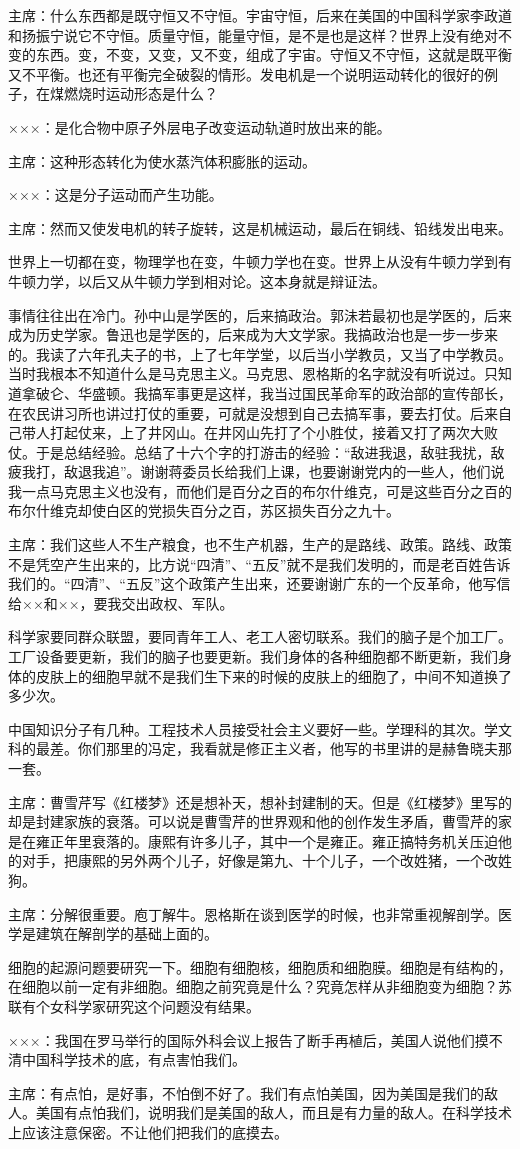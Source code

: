 主席：什么东西都是既守恒又不守恒。宇宙守恒，后来在美国的中国科学家李政道和扬振宁说它不守恒。质量守恒，能量守恒，是不是也是这样？世界上没有绝对不变的东西。变，不变，又变，又不变，组成了宇宙。守恒又不守恒，这就是既平衡又不平衡。也还有平衡完全破裂的情形。发电机是一个说明运动转化的很好的例子，在煤燃烧时运动形态是什么？

×××：是化合物中原子外层电子改变运动轨道时放出来的能。

主席：这种形态转化为使水蒸汽体积膨胀的运动。

×××：这是分子运动而产生功能。

主席：然而又使发电机的转子旋转，这是机械运动，最后在铜线、铅线发出电来。

世界上一切都在变，物理学也在变，牛顿力学也在变。世界上从没有牛顿力学到有牛顿力学，以后又从牛顿力学到相对论。这本身就是辩证法。

事情往往出在冷门。孙中山是学医的，后来搞政治。郭沬若最初也是学医的，后来成为历史学家。鲁迅也是学医的，后来成为大文学家。我搞政治也是一步一步来的。我读了六年孔夫子的书，上了七年学堂，以后当小学教员，又当了中学教员。当时我根本不知道什么是马克思主义。马克思、恩格斯的名字就没有听说过。只知道拿破仑、华盛顿。我搞军事更是这样，我当过国民革命军的政治部的宣传部长，在农民讲习所也讲过打仗的重要，可就是没想到自己去搞军事，要去打仗。后来自己带人打起仗来，上了井冈山。在井冈山先打了个小胜仗，接着又打了两次大败仗。于是总结经验。总结了十六个字的打游击的经验：“敌进我退，敌驻我扰，敌疲我打，敌退我追”。谢谢蒋委员长给我们上课，也要谢谢党内的一些人，他们说我一点马克思主义也没有，而他们是百分之百的布尔什维克，可是这些百分之百的布尔什维克却使白区的党损失百分之百，苏区损失百分之九十。

主席：我们这些人不生产粮食，也不生产机器，生产的是路线、政策。路线、政策不是凭空产生出来的，比方说“四清”、“五反”就不是我们发明的，而是老百姓告诉我们的。“四清”、“五反”这个政策产生出来，还要谢谢广东的一个反革命，他写信给××和××，要我交出政权、军队。

科学家要同群众联盟，要同青年工人、老工人密切联系。我们的脑子是个加工厂。工厂设备要更新，我们的脑子也要更新。我们身体的各种细胞都不断更新，我们身体的皮肤上的细胞早就不是我们生下来的时候的皮肤上的细胞了，中间不知道换了多少次。

中国知识分子有几种。工程技术人员接受社会主义要好一些。学理科的其次。学文科的最差。你们那里的冯定，我看就是修正主义者，他写的书里讲的是赫鲁晓夫那一套。

主席：曹雪芹写《红楼梦》还是想补天，想补封建制的天。但是《红楼梦》里写的却是封建家族的衰落。可以说是曹雪芹的世界观和他的创作发生矛盾，曹雪芹的家是在雍正年里衰落的。康熙有许多儿子，其中一个是雍正。雍正搞特务机关压迫他的对手，把康熙的另外两个儿子，好像是第九、十个儿子，一个改姓猪，一个改姓狗。

主席：分解很重要。庖丁解牛。恩格斯在谈到医学的时候，也非常重视解剖学。医学是建筑在解剖学的基础上面的。

细胞的起源问题要研究一下。细胞有细胞核，细胞质和细胞膜。细胞是有结构的，在细胞以前一定有非细胞。细胞之前究竟是什么？究竟怎样从非细胞变为细胞？苏联有个女科学家研究这个问题没有结果。

×××：我国在罗马举行的国际外科会议上报告了断手再植后，美国人说他们摸不清中国科学技术的底，有点害怕我们。

主席：有点怕，是好事，不怕倒不好了。我们有点怕美国，因为美国是我们的敌人。美国有点怕我们，说明我们是美国的敌人，而且是有力量的敌人。在科学技术上应该注意保密。不让他们把我们的底摸去。

